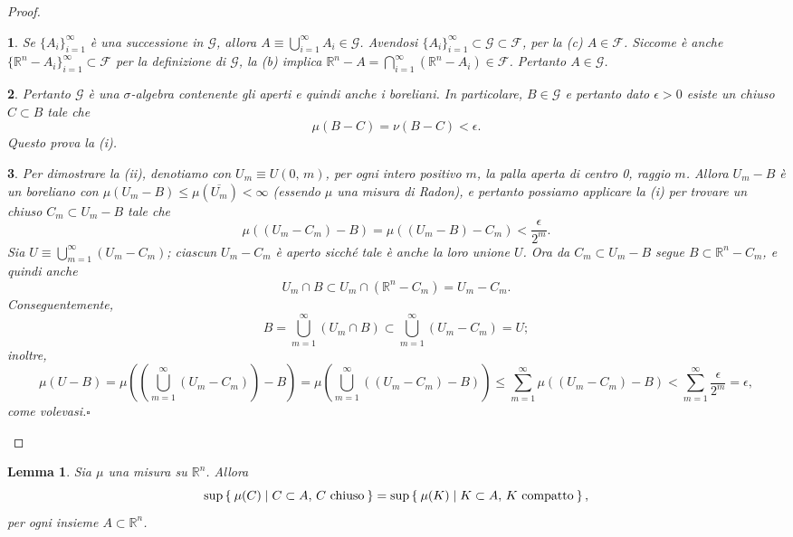 \documentclass[a4paper,10pt,openright,oneside]{book}
\theoremstyle{theoremstyle}
\newtheorem{lemma}[teorema]{Lemma}
\theoremstyle{theoremstylewoheader}
\theoremstyle{theoremstyle}
\theoremstyle{proofsecstyle}
\newtheorem{proofsec}{}
\theoremstyle{nonumberplain}
\newtheorem{proof}{Dim.}
\newcommand{\FF}{\ensuremath{\mathcal{F}}}
\newcommand{\GG}{\ensuremath{\mathcal{G}}}
\newcommand{\RR}{\ensuremath{\mathbb{R}}}
\newcommand{\closure}[1]{\ensuremath{\overline{#1}}}
\renewcommand{\qedsymbol}{\ensuremath{\square}}
\newcommand{\qed}{\unskip\nobreak\hfill\nobreak\hspace{.5em}\qedsymbol}
\begin{document}
\begin{proof}
\begin{proofsec}
\emph{Se $\{A_i\}_{i=1}^\infty$ è una successione in $\GG$, allora $A \equiv \bigcup_{i=1}^\infty A_i \in \GG$.}\hspace{.5em} Avendosi $\{A_i\}_{i=1}^\infty \subset \GG \subset \FF$, per la (c) $A \in \FF$. Siccome è anche $\{\RR^n - A_i\}_{i=1}^\infty \subset \FF$ per la definizione di $\GG$, la (b) implica $\RR^n - A = \bigcap_{i=1}^\infty(\RR^n - A_i) \in \FF$. Pertanto $A \in \GG$.
\end{proofsec}

\begin{proofsec}
Pertanto $\GG$ è una $\sigma$-algebra contenente gli aperti e quindi anche i boreliani. In particolare, $B \in \GG$ e pertanto dato $\epsilon > 0$ esiste un chiuso $C \subset B$ tale che
\[
\mu(B - C) = \nu(B - C) < \epsilon.
\]
Questo prova la (i).
\end{proofsec}

\begin{proofsec}
Per dimostrare la (ii), denotiamo con $U_m \equiv U(0,\, m)$, per ogni intero positivo $m$, la palla aperta di centro 0, raggio $m$. Allora $U_m - B$ è un boreliano con $\mu(U_m - B) \le \mu(\closure{U_m}) < \infty$ (essendo $\mu$ una misura di Radon), e pertanto possiamo applicare la (i) per trovare un chiuso $C_m \subset U_m - B$ tale che
\[
\mu((U_m - C_m) - B) = \mu((U_m - B) - C_m) < \frac{\epsilon}{2^m}.
\]
Sia $U \equiv \bigcup_{m=1}^\infty (U_m - C_m)$; ciascun $U_m - C_m$ è aperto sicché tale è anche la loro unione $U$. Ora da $C_m \subset U_m - B$ segue $B \subset \RR^n - C_m$, e quindi anche
\[
U_m \cap B \subset U_m \cap (\RR^n - C_m) = U_m - C_m.
\]
Conseguentemente,
\[
B = \bigcup_{m=1}^\infty (U_m \cap B) \subset \bigcup_{m=1}^\infty (U_m - C_m) = U;
\]
inoltre,
\[
\mu(U - B) = \mu\left(\left(\bigcup_{m=1}^\infty (U_m - C_m)\right) - B\right) = \mu\left(\bigcup_{m=1}^\infty ((U_m - C_m) - B)\right) \le \sum_{m=1}^\infty \mu((U_m - C_m) - B) < \sum_{m=1}^\infty \frac{\epsilon}{2^m} = \epsilon,
\]
come volevasi.\qed
\end{proofsec}
\end{proof}

\begin{lemma}
\label{lem:sup_chiusi_uguale_sup_compatti}
Sia $\mu$ una misura su $\RR^n$. Allora
\[
\sup\Set{ \mu(C) | C \subset A,\, C \text{ chiuso} } = \sup\Set{ \mu(K) | K \subset A,\, K \text{ compatto} },
\]
per ogni insieme $A \subset \RR^n$.
\end{lemma}
\end{document}
